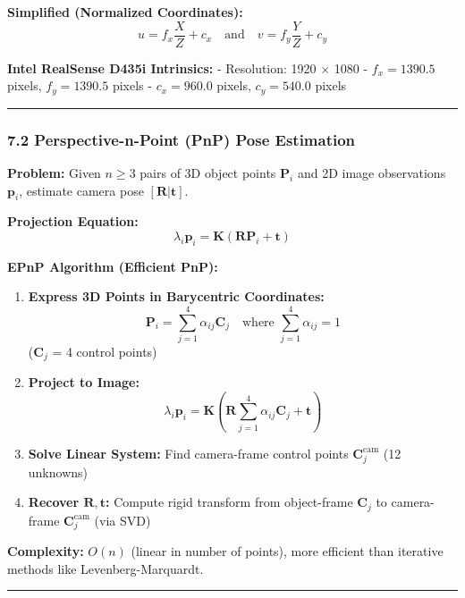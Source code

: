 \documentclass[
]{article}
\begin{document}
\textbf{Simplified (Normalized Coordinates):} \[
u = f_x \frac{X}{Z} + c_x \quad \text{and} \quad v = f_y \frac{Y}{Z} + c_y
\]

\textbf{Intel RealSense D435i Intrinsics:} - Resolution: 1920 × 1080 -
\(f_x = 1390.5\) pixels, \(f_y = 1390.5\) pixels - \(c_x = 960.0\)
pixels, \(c_y = 540.0\) pixels

\begin{center}\rule{0.5\linewidth}{0.5pt}\end{center}

\hypertarget{perspective-n-point-pnp-pose-estimation}{%
\subsubsection{7.2 Perspective-n-Point (PnP) Pose
Estimation}\label{perspective-n-point-pnp-pose-estimation}}

\textbf{Problem:} Given \(n \geq 3\) pairs of 3D object points
\(\mathbf{P}_i\) and 2D image observations \(\mathbf{p}_i\), estimate
camera pose \([\mathbf{R} | \mathbf{t}]\).

\textbf{Projection Equation:} \[
\lambda_i \mathbf{p}_i = \mathbf{K} (\mathbf{R} \mathbf{P}_i + \mathbf{t})
\]

\textbf{EPnP Algorithm (Efficient PnP):}

\begin{enumerate}
\def\labelenumi{\arabic{enumi}.}
\item
  \textbf{Express 3D Points in Barycentric Coordinates:} \[
  \mathbf{P}_i = \sum_{j=1}^4 \alpha_{ij} \mathbf{C}_j \quad \text{where } \sum_{j=1}^4 \alpha_{ij} = 1
  \] (\(\mathbf{C}_j\) = 4 control points)
\item
  \textbf{Project to Image:} \[
  \lambda_i \mathbf{p}_i = \mathbf{K} \left( \mathbf{R} \sum_{j=1}^4 \alpha_{ij} \mathbf{C}_j + \mathbf{t} \right)
  \]
\item
  \textbf{Solve Linear System:} Find camera-frame control points
  \(\mathbf{C}_j^{\text{cam}}\) (12 unknowns)
\item
  \textbf{Recover \(\mathbf{R}, \mathbf{t}\):} Compute rigid transform
  from object-frame \(\mathbf{C}_j\) to camera-frame
  \(\mathbf{C}_j^{\text{cam}}\) (via SVD)
\end{enumerate}

\textbf{Complexity:} \(O(n)\) (linear in number of points), more
efficient than iterative methods like Levenberg-Marquardt.

\begin{center}\rule{0.5\linewidth}{0.5pt}\end{center}
\end{document}
